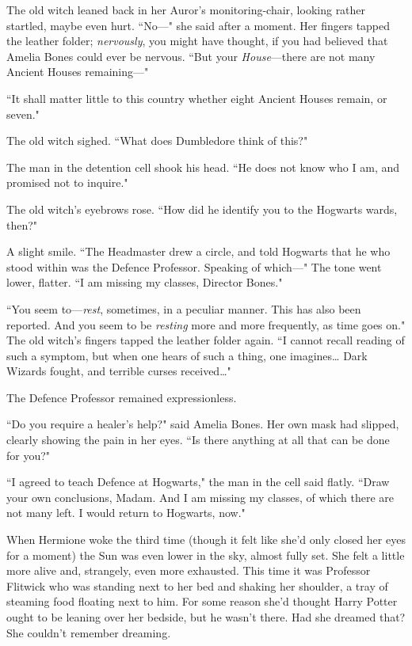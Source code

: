 The old witch leaned back in her Auror's monitoring-chair, looking rather startled, maybe even hurt. ``No—" she said after a moment. Her fingers tapped the leather folder; \emph{nervously}, you might have thought, if you had believed that Amelia Bones could ever be nervous. ``But your \emph{House}—there are not many Ancient Houses remaining—"

``It shall matter little to this country whether eight Ancient Houses remain, or seven."

The old witch sighed. ``What does Dumbledore think of this?"

The man in the detention cell shook his head. ``He does not know who I am, and promised not to inquire."

The old witch's eyebrows rose. ``How did he identify you to the Hogwarts wards, then?"

A slight smile. ``The Headmaster drew a circle, and told Hogwarts that he who stood within was the Defence Professor. Speaking of which—" The tone went lower, flatter. ``I am missing my classes, Director Bones."

``You seem to—\emph{rest}, sometimes, in a peculiar manner. This has also been reported. And you seem to be \emph{resting} more and more frequently, as time goes on." The old witch's fingers tapped the leather folder again. ``I cannot recall reading of such a symptom, but when one hears of such a thing, one imagines{\ldots} Dark Wizards fought, and terrible curses received{\ldots}"

The Defence Professor remained expressionless.

``Do you require a healer's help?" said Amelia Bones. Her own mask had slipped, clearly showing the pain in her eyes. ``Is there anything at all that can be done for you?"

``I agreed to teach Defence at Hogwarts," the man in the cell said flatly. ``Draw your own conclusions, Madam. And I am missing my classes, of which there are not many left. I would return to Hogwarts, now."

\later

When Hermione woke the third time (though it felt like she'd only closed her eyes for a moment) the Sun was even lower in the sky, almost fully set. She felt a little more alive and, strangely, even more exhausted. This time it was Professor Flitwick who was standing next to her bed and shaking her shoulder, a tray of steaming food floating next to him. For some reason she'd thought Harry Potter ought to be leaning over her bedside, but he wasn't there. Had she dreamed that? She couldn't remember dreaming.

